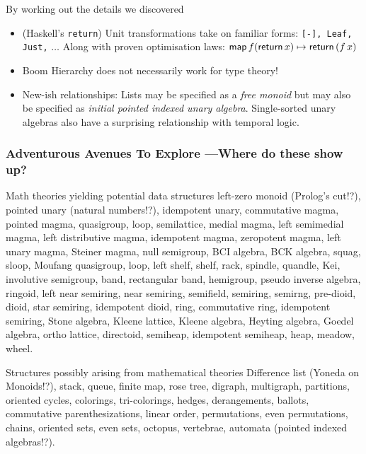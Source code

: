 \documentclass[serif,mathserif,10pt]{beamer}
\newcommand{\sred}[1]{\textcolor{slidered}{#1}}
\begin{document}
\begin{frame}
{\begin{block}{By working out the details we \alert{discovered} }
\begin{itemize}
    \pause      
    \item (Haskell's \texttt{return}) Unit transformations take on familiar forms:
      \texttt{[-], Leaf, Just,} $…$
      Along with proven optimisation laws:
      $\mathsf{map}\, f (\mathsf{return}\, x) \mapsto \mathsf{return}\, (f\, x)$
      
      \pause      
    \item \alert{Boom Hierarchy does not necessarily work for type theory!}

    \pause      
    \item New-ish relationships: Lists may be specified as a \emph{free monoid}
      but may also be specified as \emph{initial pointed indexed unary algebra}.
      Single-sorted unary algebras also have a surprising relationship with temporal logic. %
    \end{itemize}
  \end{block}

}
  
\end{frame}

\begin{frame} \frametitle{Adventurous Avenues To Explore
    \hfill {\footnotesize ---Where do these show up?}}

  \pause
  \vspace{-1.4em}
  \begin{block}{Math theories yielding potential data structures}
    {\small left-zero monoid \sred{(Prolog's cut!?)}, pointed unary \sred{(natural numbers!?)}, idempotent unary, commutative
magma, pointed magma, quasigroup, loop, semilattice, medial magma,
left semimedial magma, left distributive magma, idempotent magma,
zeropotent magma, left unary magma, Steiner magma, null semigroup, BCI algebra, BCK
algebra, squag, sloop, Moufang quasigroup, loop, left shelf, shelf,
rack, spindle, quandle, Kei, involutive semigroup, band, rectangular
band, hemigroup, pseudo inverse algebra, ringoid, left near semiring,
near semiring, semifield, semiring, semirng, pre-dioid, dioid, star semiring,
idempotent dioid, ring, commutative ring, idempotent semiring, Stone algebra,
Kleene lattice, Kleene algebra, Heyting algebra, Goedel algebra, ortho
lattice, directoid, semiheap, idempotent semiheap, heap, meadow, wheel. }
\end{block}

  \pause
  \begin{block}{Structures possibly arising from mathematical theories}
        Difference list \sred{(Yoneda on Monoids!?)}, stack, queue, finite map, rose tree, digraph,
multigraph, partitions, oriented cycles, colorings, tri-colorings,
hedges, derangements, ballots, commutative parenthesizations, linear
order, permutations, even permutations, chains, oriented sets, even
sets, octopus, vertebrae, automata \sred{(pointed indexed algebras!?)}.
  \end{block}  
\end{frame}
\end{document}
